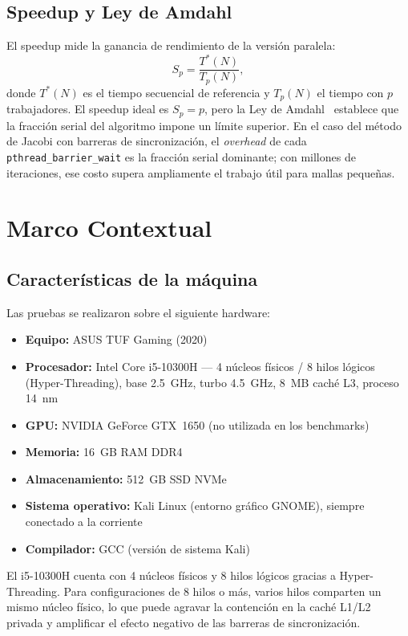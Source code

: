 \documentclass{article}
\begin{document}
\subsection{Speedup y Ley de Amdahl}

El speedup mide la ganancia de rendimiento de la versión paralela:
\[
  S_p = \frac{T^*(N)}{T_p(N)},
\]
donde $T^*(N)$ es el tiempo secuencial de referencia y $T_p(N)$ el tiempo
con $p$ trabajadores.  El speedup ideal es $S_p = p$, pero la Ley de
Amdahl~\cite{amdahl} establece que la fracción serial del algoritmo impone un
límite superior.  En el caso del método de Jacobi con barreras de
sincronización, el \emph{overhead} de cada \texttt{pthread\_barrier\_wait} es la
fracción serial dominante; con millones de iteraciones, ese costo supera
ampliamente el trabajo útil para mallas pequeñas.

\section{Marco Contextual}

\subsection{Características de la máquina}

Las pruebas se realizaron sobre el siguiente hardware:

\begin{itemize}
  \item \textbf{Equipo:} ASUS TUF Gaming (2020)
  \item \textbf{Procesador:} Intel Core i5-10300H --- 4 núcleos físicos / 8
    hilos lógicos (Hyper-Threading), base 2.5~GHz, turbo 4.5~GHz, 8~MB caché
    L3, proceso 14~nm
  \item \textbf{GPU:} NVIDIA GeForce GTX~1650 (no utilizada en los benchmarks)
  \item \textbf{Memoria:} 16~GB RAM DDR4
  \item \textbf{Almacenamiento:} 512~GB SSD NVMe
  \item \textbf{Sistema operativo:} Kali Linux (entorno gráfico GNOME), siempre
    conectado a la corriente
  \item \textbf{Compilador:} GCC (versión de sistema Kali)
\end{itemize}

El i5-10300H cuenta con 4 núcleos físicos y 8 hilos lógicos gracias a
Hyper-Threading.  Para configuraciones de 8 hilos o más, varios hilos comparten
un mismo núcleo físico, lo que puede agravar la contención en la caché L1/L2
privada y amplificar el efecto negativo de las barreras de sincronización.
\end{document}
